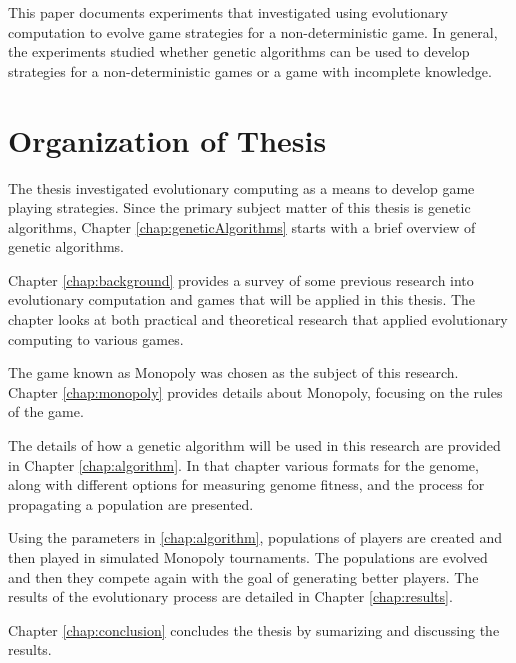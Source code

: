 This paper documents experiments that investigated using evolutionary
computation to evolve game strategies for a non-deterministic game. In general,
the experiments studied whether genetic algorithms can be used to develop
strategies for a non-deterministic games or a game with incomplete knowledge.

\section{Organization of Thesis}

The thesis investigated evolutionary computing as a means to develop game
playing strategies. Since the primary subject matter of this thesis is genetic
algorithms, Chapter \ref{chap:geneticAlgorithms} starts with a brief overview of genetic algorithms.

Chapter \ref{chap:background} provides a survey of some previous research into
evolutionary computation and games that will be applied in this thesis. The chapter
looks at both practical and theoretical research that applied evolutionary
computing to various games.

The game known as Monopoly was chosen as the subject of this research. Chapter
\ref{chap:monopoly} provides details about Monopoly, focusing on the rules of
the game.

The details of how a genetic algorithm will be used in this research are provided
in Chapter \ref{chap:algorithm}. In that chapter various formats for the genome,
along with different options for measuring genome fitness, and the process for
propagating a population are presented.

Using the parameters in \ref{chap:algorithm}, populations of players are created
and then played in simulated Monopoly tournaments. The populations are evolved
and then they compete again with the goal of generating better players. The
results of the evolutionary process are detailed in Chapter \ref{chap:results}.

Chapter \ref{chap:conclusion} concludes the thesis by sumarizing and discussing
the results.
